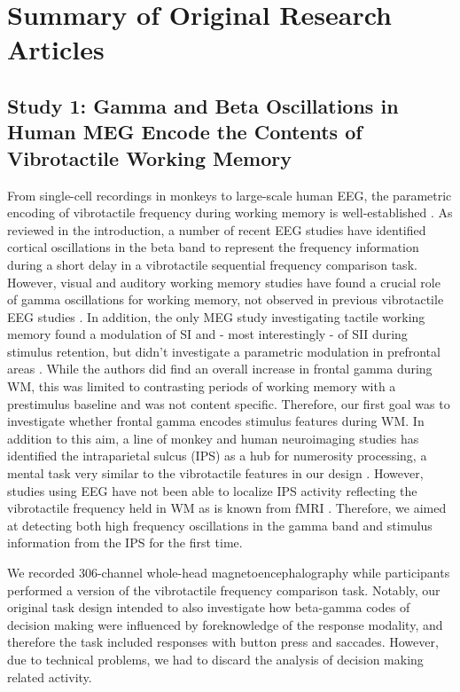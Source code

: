 
\chapter{Summary of Original Research Articles}


\section{Study 1: Gamma and Beta Oscillations in Human MEG Encode the Contents of Vibrotactile Working Memory}
From single-cell recordings in monkeys to large-scale human EEG, the parametric encoding of vibrotactile frequency during working memory is well-established \parencite{Romo1999,Spitzer2010}. As reviewed in the introduction, a number of recent EEG studies have identified cortical oscillations in the beta band to represent the frequency information during a short delay in a vibrotactile sequential frequency comparison task. However, visual and auditory working memory studies have found a crucial role of gamma oscillations for working memory, not observed in previous vibrotactile EEG studies \parencite{Roux2014}. In addition, the only MEG study investigating tactile working memory found a modulation of SI and - most interestingly - of SII during stimulus retention, but didn’t investigate a parametric modulation in prefrontal areas \parencite{Haegens2010}. While the authors did find an overall increase in frontal gamma during WM, this was limited to contrasting periods of working memory with a prestimulus baseline and was not content specific. Therefore, our first goal was to investigate whether frontal gamma encodes stimulus features during WM. In addition to this aim, a line of monkey and human neuroimaging studies has identified the intraparietal sulcus (IPS) as a hub for numerosity processing, a mental task very similar to the vibrotactile features in our design \parencite{Nieder2016}. However, studies using EEG have not been able to localize IPS activity reflecting the vibrotactile frequency held in WM as is known from fMRI \parencite{Wu2018}. Therefore, we aimed at detecting both high frequency oscillations in the gamma band and stimulus information from the IPS for the first time.

We recorded 306-channel whole-head magnetoencephalography while participants performed a version of the vibrotactile frequency comparison task. Notably, our original task design intended to also investigate how beta-gamma codes of decision making were influenced by foreknowledge of the response modality, and therefore the task included responses with button press and saccades. However, due to technical problems, we had to discard the analysis of decision making related activity. 

